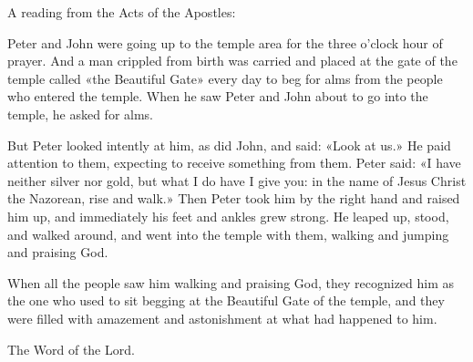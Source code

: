 \indent A reading from the Acts of the Apostles:

Peter and John were going up to the temple area for the three o’clock hour of prayer. And a man crippled from birth was carried and placed at the gate of the temple called «the Beautiful Gate» every day to beg for alms from the people who entered the temple. When he saw Peter and John about to go into the temple, he asked for alms.

But Peter looked intently at him, as did John, and said: «Look at us.» He paid attention to them, expecting to receive something from them. Peter said: «I have neither silver nor gold, but what I do have I give you: in the name of Jesus Christ the Nazorean, rise and walk.» Then Peter took him by the right hand and raised him up, and immediately his feet and ankles grew strong. He leaped up, stood, and walked around, and went into the temple with them, walking and jumping and praising God.

When all the people saw him walking and praising God, they recognized him as the one who used to sit begging at the Beautiful Gate of the temple, and they were filled with amazement and astonishment at what had happened to him.

The Word of the Lord.